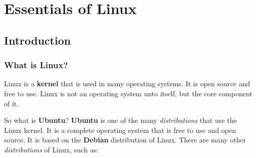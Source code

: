 \setchapterpreamble[u]{\margintoc}
\chapter{Essentials of Linux}

\section{Introduction}

\subsection{What is Linux?}

\begin{definition}[Linux]
  Linux is a \textbf{kernel} that is used in many operating systems. It is open source and free to use. Linux is not an operating system unto itself, but the core component of it.
\end{definition}

So what is \textbf{Ubuntu}? \textbf{Ubuntu} is one of the many \textit{distributions} that use the Linux kernel. It is a complete operating system that is free to use and open source. It is based on the \textbf{Debian} distribution of Linux. There are many other \textit{distributions} of Linux, such as:

